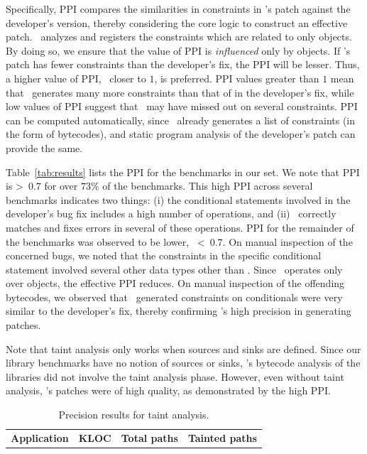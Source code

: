 \begin{mylist}
Specifically, PPI compares the similarities in constraints in \tool's patch
against the developer's version, thereby considering the core logic to construct
an effective patch. \tool\ analyzes and registers the constraints which are
related to only  objects. By doing so, we ensure that the value of
PPI is \emph{influenced} only by  objects. If \tool's patch has
fewer constraints than the developer's fix, the PPI will be lesser. Thus, a
higher value of PPI, \ie\ closer to $1$, is preferred. PPI values greater than
$1$ mean that \tool\ generates many more constraints than that of in the
developer's fix, while low values of PPI suggest that \tool\ may have missed out
on several constraints. PPI can be computed automatically, since \tool\ already
generates a list of constraints (in the form of bytecodes), and static program
analysis of the developer's patch can provide the same.

Table~\ref{tab:results} lists the PPI for the benchmarks in our set. We note
that PPI is \textgreater\ $0.7$ for over $73\%$ of the benchmarks. This high PPI
across several benchmarks indicates two things: (i) the conditional statements involved
in the developer's bug fix includes a high number of  operations,
and (ii) \tool\ correctly matches and fixes errors in several of these
 operations. PPI for the remainder of the benchmarks was observed
to be lower, \ie\ \textless\ $0.7$. On manual inspection of the concerned bugs,
we noted that the constraints in the specific conditional statement involved several
other data types other than . Since \tool\ operates only over
 objects, the effective PPI reduces. On manual inspection of the
offending bytecodes, we observed that \tool\ generated constraints on
 conditionals were very similar to the developer's fix, thereby
confirming \tool's high precision in generating patches.

Note that taint analysis only works when sources and sinks are defined.
Since our library benchmarks have no notion of sources or sinks, \tool's
bytecode analysis of the libraries did not involve the taint analysis phase.
However, even without taint analysis, \tool's patches were of high quality, as
demonstrated by the high PPI.

\begin{table}[t]
\centering
\caption{Precision results for taint analysis.}
\scriptsize
\begin{tabular}{|l|r|r|r|}
\hline
\multicolumn{1}{|c|}{\textbf{Application}} &
\multicolumn{1}{c|}{\textbf{KLOC}} &
\multicolumn{1}{c|}{\textbf{Total paths}} &
\multicolumn{1}{c|}{\textbf{Tainted paths}}\\


\end{tabular}
\end{table}
\end{mylist}
